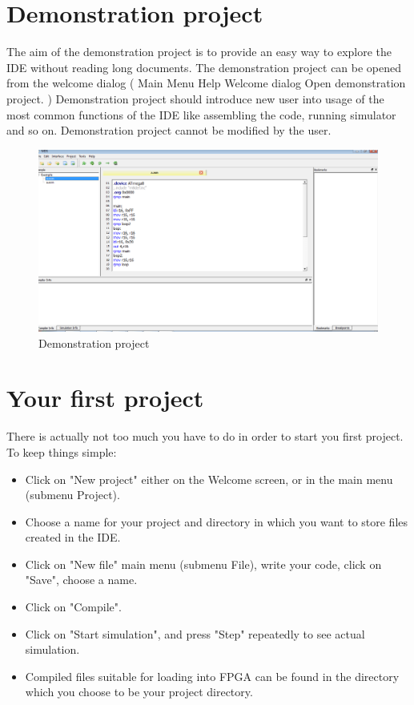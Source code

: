 
\section{Demonstration project}
    The aim of the demonstration project is to provide an easy way to explore the IDE without reading long documents. The demonstration project can be opened from the welcome dialog ( Main Menu Help Welcome dialog Open demonstration project. ) Demonstration project should introduce new user into usage of the most common functions of the IDE like assembling the code, running simulator and so on. Demonstration project cannot be modified by the user.
    \begin{figure}[h]
        \centering{}
        \includegraphics [scale=0.4]{img/Demonstration_project.png}
        \caption{Demonstration project}
    \end{figure}

\section{Your first project}
    There is actually not too much you have to do in order to start you first project. To keep things simple:
    \begin{itemize}
        \item Click on "New project" either on the Welcome screen, or in the main menu (submenu Project).
        \item Choose a name for your project and directory in which you want to store files created in the IDE.
        \item Click on "New file" main menu (submenu File), write your code, click on "Save", choose a name.
        \item Click on "Compile".
        \item Click on "Start simulation", and press "Step" repeatedly to see actual simulation.
        \item Compiled files suitable for loading into FPGA can be found in the directory which you choose to be your project directory.
    \end{itemize}

